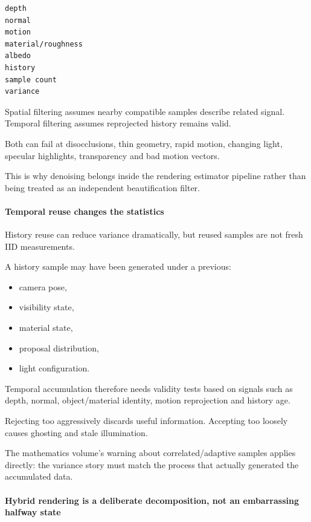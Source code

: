 \begin{verbatim}
depth
normal
motion
material/roughness
albedo
history
sample count
variance
\end{verbatim}

Spatial filtering assumes nearby compatible samples describe related signal. Temporal filtering assumes reprojected history remains valid.

Both can fail at disocclusions, thin geometry, rapid motion, changing light, specular highlights, transparency and bad motion vectors.

This is why denoising belongs inside the rendering estimator pipeline rather than being treated as an independent beautification filter.

\paragraph{Temporal reuse changes the statistics}\label{03-visual-computing-i-ch001-temporal-reuse-changes-the-statistics}

\hypertarget{03-visual-computing-i-ch001-temporal-reuse-changes-the-statistics}{}

History reuse can reduce variance dramatically, but reused samples are not fresh IID measurements.

A history sample may have been generated under a previous:

\begin{itemize}
\tightlist
\item
  camera pose,
\item
  visibility state,
\item
  material state,
\item
  proposal distribution,
\item
  light configuration.
\end{itemize}

Temporal accumulation therefore needs validity tests based on signals such as depth, normal, object/material identity, motion reprojection and history age.

Rejecting too aggressively discards useful information. Accepting too loosely causes ghosting and stale illumination.

The mathematics volume's warning about correlated/adaptive samples applies directly: the variance story must match the process that actually generated the accumulated data.

\paragraph{Hybrid rendering is a deliberate decomposition, not an embarrassing halfway state}\label{03-visual-computing-i-ch001-hybrid-rendering-is-a-deliberate-decomposition-not-an-embarrassing-halfway-state}

